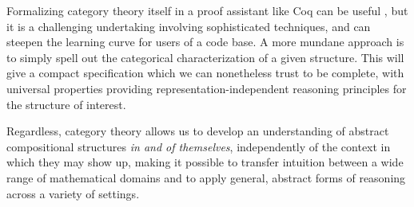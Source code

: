\documentclass[11pt,oneside,draft]{book}
\theoremstyle{definition}
\begin{document}
Formalizing category theory itself
in a proof assistant like Coq
can be useful \citep{math-classes},
but it is a challenging undertaking
involving sophisticated techniques,
and can steepen the learning curve
for users of a code base.
A more mundane approach
is to simply spell out
the categorical characterization of a given structure.
This will give a compact specification
which we can nonetheless trust to be complete,
with universal properties 
providing
representation-independent reasoning principles
for the structure of interest.

Regardless,
category theory allows us
to develop an understanding of abstract compositional structures
\emph{in and of themselves},
independently of the context in which they may show up,
making it possible to transfer intuition between
a wide range of mathematical domains
and to apply general, abstract forms of reasoning
across a variety of settings.
\end{document}
